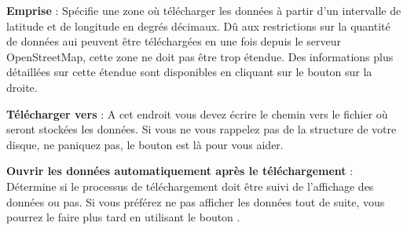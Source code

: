 \begin{description}
\item \textbf{Emprise} : Spécifie une zone où télécharger les données à partir d'un intervalle de latitude et de longitude en degrés décimaux. Dû aux restrictions sur la quantité de données aui peuvent être téléchargées en une fois depuis le serveur OpenStreetMap, cette zone ne doit pas être trop étendue. Des informations plus détaillées sur cette étendue sont disponibles en cliquant sur le bouton  sur la droite.
\item \textbf{Télécharger vers} : A cet endroit vous devez écrire le chemin vers le fichier où seront stockées les données. Si vous ne vous rappelez pas de la structure de votre disque, ne paniquez pas, le bouton  est là pour vous aider.
\item \textbf{Ouvrir les données automatiquement après le téléchargement} : Détermine si le processus de téléchargement doit être suivi de l'affichage des données ou pas. Si vous préférez ne pas afficher les données tout de suite, vous pourrez le faire plus tard en utilisant le bouton .

\end{description}
